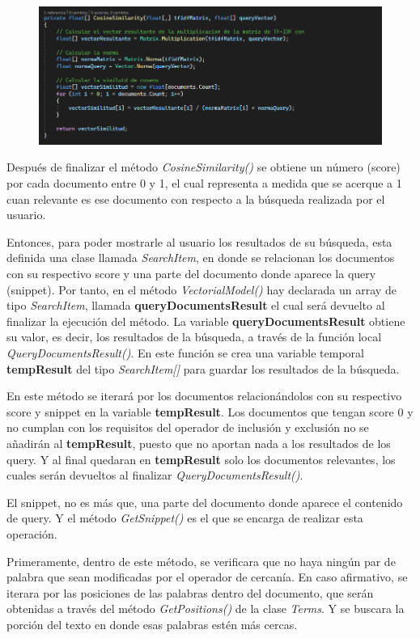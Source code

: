 \documentclass[a4paper,12pt]{report}
\begin{document}
\begin{figure}[h]
    \includegraphics*[width=15cm]{fotos/06 - Similud de coseno.png}
\end{figure}

Después de finalizar el método \textit{CosineSimilarity()} se obtiene un número (score) por cada documento
entre 0 y 1, el cual representa a medida que se acerque a 1 cuan relevante es ese documento con
respecto a la búsqueda realizada por el usuario.

Entonces, para poder mostrarle al usuario los resultados de su búsqueda, esta definida una clase
llamada \textit{SearchItem}, en donde se relacionan los documentos con su respectivo score y una parte del
documento donde aparece la query (snippet). Por tanto, en el método \textit{VectorialModel()} hay
declarada un array de tipo \textit{SearchItem}, llamada \textbf{queryDocumentsResult} el cual será devuelto al
finalizar la ejecución del método. La variable \textbf{queryDocumentsResult} obtiene su valor, es decir, los
resultados de la búsqueda, a través de la función local \textit{QueryDocumentsResult()}. En este función se
crea una variable temporal \textbf{tempResult} del tipo \textit{SearchItem[]} para guardar los resultados de la
búsqueda.

En este método se iterará por los documentos relacionándolos con su respectivo score y snippet en
la variable \textbf{tempResult}. Los documentos que tengan score 0 y no cumplan con los requisitos del
operador de inclusión y exclusión  no se añadirán al \textbf{tempResult}, puesto que no aportan
nada a los resultados de los query. Y al final quedaran en \textbf{tempResult} solo los documentos relevantes,
los cuales serán devueltos al finalizar \textit{QueryDocumentsResult()}.

El snippet, no es más que, una parte del documento donde aparece el contenido de query. Y el
método \textit{GetSnippet()} es el que se encarga de realizar esta operación.

Primeramente, dentro de este método, se verificara que no haya ningún par de palabra que sean
modificadas por el operador de cercanía. En caso afirmativo, se iterara por las posiciones de
las palabras dentro del documento, que serán obtenidas a través del método \textit{GetPositions()} de la
clase \textit{Terms}. Y se buscara la porción del texto en donde esas palabras estén más cercas.
\end{document}
